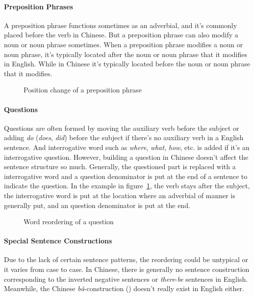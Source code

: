 \paragraph{Preposition Phrases}
A preposition phrase functions sometimes as an adverbial, and it's commonly placed before the verb in Chinese. But a preposition phrase can also modify a noun or noun phrase sometimes. When a preposition phrase modifies a noun or noun phrase, it's typically located after the noun or noun phrase that it modifies in English. While in Chinese it's typically located before the noun or noun phrase that it modifies.

\begin{figure}[H]
\centering

\caption{Position change of a preposition phrase}
\end{figure}

\paragraph{Questions}
Questions are often formed by moving the auxiliary verb before the subject or adding \emph{do} (\emph{does}, \emph{did}) before the subject if there's no auxiliary verb in a English sentence. And interrogative word such as \emph{where}, \emph{what}, \emph{how}, etc. is added if it's an interrogative question. However, building a question in Chinese doesn't affect the sentence structure so much. Generally, the questioned part is replaced with a interrogative word and a question denominator is put at the end of a sentence to indicate the question. In the example in figure~\ref{question}, the verb stays after the subject, the interrogative word is put at the location where an adverbial of manner is generally put, and an question denominator is put at the end.

\begin{figure}[H]
\centering

\caption{Word reordering of a question}
\label{question}
\end{figure}

\paragraph{Special Sentence Constructions}
Due to the lack of certain sentence patterns, the reordering could be untypical or it varies from case to case. In Chinese, there is generally no sentence construction corresponding to the inverted negative sentences or \emph{there}-\emph{be} sentences in English. Meanwhile, the Chinese \emph{bǎ}-construction () doesn't really exist in English either.

